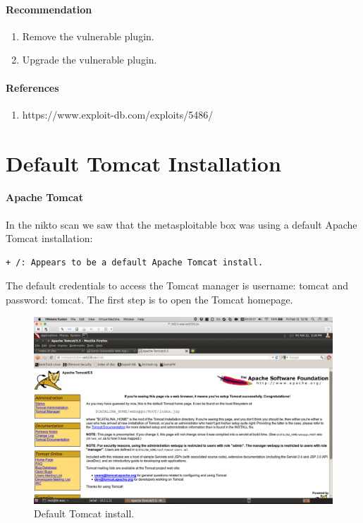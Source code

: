 \documentclass{article}
\begin{document}
\paragraph{Recommendation}

\begin{enumerate}
  \item Remove the vulnerable plugin.
  \item Upgrade the vulnerable plugin.
\end{enumerate}

\paragraph{References}

\begin{enumerate}
  \item https://www.exploit-db.com/exploits/5486/
\end{enumerate}

\newpage
\section{Default Tomcat Installation}

\paragraph{Apache Tomcat}
In the nikto scan we saw that the metasploitable box was using a default Apache
Tomcat installation:

\begin{lstlisting}
+ /: Appears to be a default Apache Tomcat install.
\end{lstlisting}

The default credentials to access the Tomcat manager is username: tomcat and password: tomcat.
The first step is to open the Tomcat homepage.

\begin{figure}[h!]
	\includegraphics[width=\linewidth]{images/tomcat-metasploitable.png}
	\caption{Default Tomcat install.}
	\label{fig:tomcat-injection1}
\end{figure}
\end{document}
